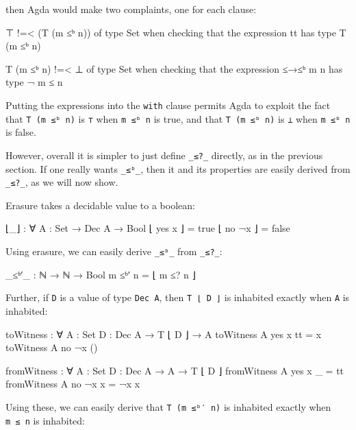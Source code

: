 then Agda would make two complaints, one for each clause:

\begin{myDisplay}
⊤ !=< (T (m ≤ᵇ n)) of type Set
when checking that the expression tt has type T (m ≤ᵇ n)

T (m ≤ᵇ n) !=< ⊥ of type Set
when checking that the expression ≤→≤ᵇ {m} {n} has type ¬ m ≤ n
\end{myDisplay}

Putting the expressions into the \texttt{with} clause permits Agda to
exploit the fact that \texttt{T\ (m\ ≤ᵇ\ n)} is \texttt{⊤} when
\texttt{m\ ≤ᵇ\ n} is true, and that \texttt{T\ (m\ ≤ᵇ\ n)} is \texttt{⊥}
when \texttt{m\ ≤ᵇ\ n} is false.

However, overall it is simpler to just define \texttt{\_≤?\_} directly,
as in the previous section. If one really wants \texttt{\_≤ᵇ\_}, then it
and its properties are easily derived from \texttt{\_≤?\_}, as we will
now show.

Erasure takes a decidable value to a boolean:

\begin{fence}
\begin{code}
⌊_⌋ : ∀ {A : Set} → Dec A → Bool
⌊ yes x ⌋  =  true
⌊ no ¬x ⌋  =  false
\end{code}
\end{fence}

Using erasure, we can easily derive \texttt{\_≤ᵇ\_} from
\texttt{\_≤?\_}:

\begin{fence}
\begin{code}
_≤ᵇ′_ : ℕ → ℕ → Bool
m ≤ᵇ′ n  =  ⌊ m ≤? n ⌋
\end{code}
\end{fence}

Further, if \texttt{D} is a value of type \texttt{Dec\ A}, then
\texttt{T\ ⌊\ D\ ⌋} is inhabited exactly when \texttt{A} is inhabited:

\begin{fence}
\begin{code}
toWitness : ∀ {A : Set} {D : Dec A} → T ⌊ D ⌋ → A
toWitness {A} {yes x} tt  =  x
toWitness {A} {no ¬x} ()

fromWitness : ∀ {A : Set} {D : Dec A} → A → T ⌊ D ⌋
fromWitness {A} {yes x} _  =  tt
fromWitness {A} {no ¬x} x  =  ¬x x
\end{code}
\end{fence}

Using these, we can easily derive that \texttt{T\ (m\ ≤ᵇ′\ n)} is
inhabited exactly when \texttt{m\ ≤\ n} is inhabited:

